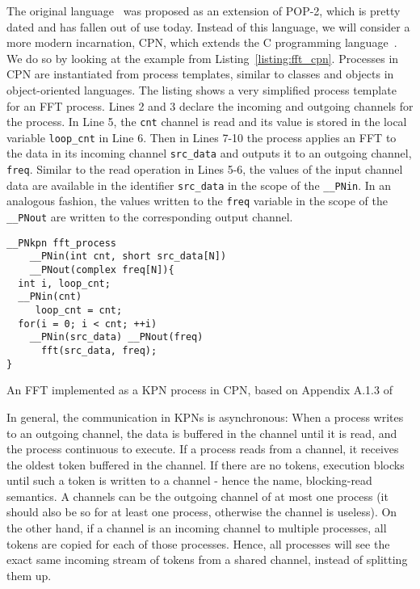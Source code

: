 The original language~\cite{kahn_macqueen} was proposed as an extension of POP-2, which is pretty dated and has fallen out of use today.
Instead of this language, we will consider a more modern incarnation, \ac{CPN}, which extends the C programming language~\cite{cpn}.
We do so by looking at the example from Listing~\ref{listing:fft_cpn}. 
Processes in \ac{CPN} are instantiated from process templates, similar to classes and objects in object-oriented languages.
The listing shows a very simplified process template for an \acs{FFT} process. 
Lines 2 and 3 declare the incoming and outgoing channels for the process.
In Line 5, the \texttt{cnt} channel is read and its value is stored in the local variable \texttt{loop_cnt} in Line 6.
Then in Lines 7-10 the process applies an \acs{FFT} to the data in its incoming channel \texttt{src\_data} and outputs it to an outgoing channel, \texttt{freq}. 
Similar to the read operation in Lines 5-6, the values of the input channel data are available in the identifier \texttt{src_data} in the scope of the \texttt{__PNin}.
In an analogous fashion, the values written to the \texttt{freq} variable in the scope of the \texttt{__PNout} are written to the corresponding output channel.

\begin{listing}
\begin{verbatim}
__PNkpn fft_process
    __PNin(int cnt, short src_data[N])
    __PNout(complex freq[N]){
  int i, loop_cnt;
  __PNin(cnt)
     loop_cnt = cnt;
  for(i = 0; i < cnt; ++i)
    __PNin(src_data) __PNout(freq)
      fft(src_data, freq);
}
\end{verbatim}
\caption{An \ac{FFT} implemented as a \ac{KPN} process in \ac{CPN}, based on Appendix A.1.3 of \cite{castrillon2014thesis}}
\label{listing:fft_cpn}
\end{listing}


In general, the communication in \acp{KPN} is asynchronous: 
When a process writes to an outgoing channel, the data is buffered in the channel until it is read, and the process continuous to execute.
If a process reads from a channel, it receives the oldest token buffered in the channel.
If there are no tokens, execution blocks until such a token is written to a channel - hence the name, blocking-read semantics.
A channels can be the outgoing channel of at most one process (it should also be so for at least one process, otherwise the channel is useless).
On the other hand, if a channel is an incoming channel to multiple processes, all tokens are copied for each of those processes.
Hence, all processes will see the exact same incoming stream of tokens from a shared channel, instead of splitting them up.

